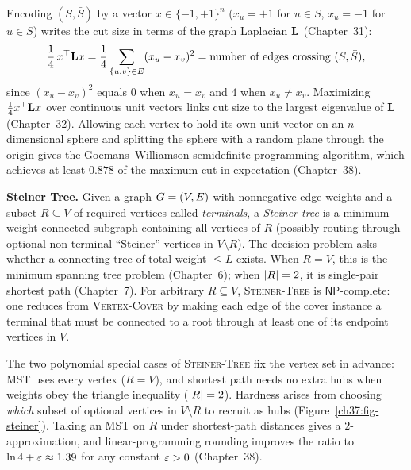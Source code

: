 \begin{connectionbox}
Encoding $(S,\bar{S})$ by a vector $x\in\{-1,+1\}^n$ ($x_u=+1$ for $u\in S$, $x_u=-1$ for $u\in\bar{S}$) writes the cut size in terms of the graph Laplacian $\mathbf{L}$ (Chapter~31):
\[
  \frac{1}{4}\,x^\top \mathbf{L} x
  = \frac{1}{4}\sum_{\{u,v\}\in E}(x_u-x_v)^2
  = \text{number of edges crossing }(S,\bar{S}),
\]
since $(x_u-x_v)^2$ equals $0$ when $x_u=x_v$ and $4$ when $x_u\neq x_v$. Maximizing $\tfrac{1}{4}x^\top \mathbf{L} x$ over continuous unit vectors links cut size to the largest eigenvalue of $\mathbf{L}$ (Chapter~32). Allowing each vertex to hold its own unit vector on an $n$-dimensional sphere and splitting the sphere with a random plane through the origin gives the Goemans--Williamson semidefinite-programming algorithm, which achieves at least $0.878$ of the maximum cut in expectation (Chapter~38).
\end{connectionbox}

\textbf{Steiner Tree.} Given a graph $G=(V,E)$ with nonnegative edge weights and a subset $R\subseteq V$
of required vertices called \emph{terminals}, a \emph{Steiner tree} is a minimum-weight connected subgraph containing all vertices of
$R$ (possibly routing through optional non-terminal ``Steiner'' vertices in $V\setminus R$). The decision problem asks whether a connecting tree of total weight $\le L$ exists. When $R=V$, this is the minimum
spanning tree problem (Chapter~6); when $\lvert R\rvert=2$, it is single-pair shortest path (Chapter~7). For arbitrary $R\subseteq V$, \textsc{Steiner-Tree} is $\mathsf{NP}$-complete: one reduces from \textsc{Vertex-Cover} by making each edge of the cover instance a terminal that must be connected to a root through at least one of its endpoint vertices in $V$.

\begin{intuitionbox}
The two polynomial special cases of \textsc{Steiner-Tree} fix the vertex set in advance: MST uses every vertex ($R=V$), and shortest path needs no extra hubs when weights obey the triangle inequality ($\lvert R\rvert=2$). Hardness arises from choosing \emph{which} subset of optional vertices in $V\setminus R$ to recruit as hubs
(Figure~\ref{ch37:fig-steiner}).
Taking an MST on $R$ under shortest-path distances gives a $2$-approximation, and linear-programming rounding improves the ratio to $\ln 4 + \varepsilon \approx 1.39$ for any constant $\varepsilon>0$ (Chapter~38).
\end{intuitionbox}

